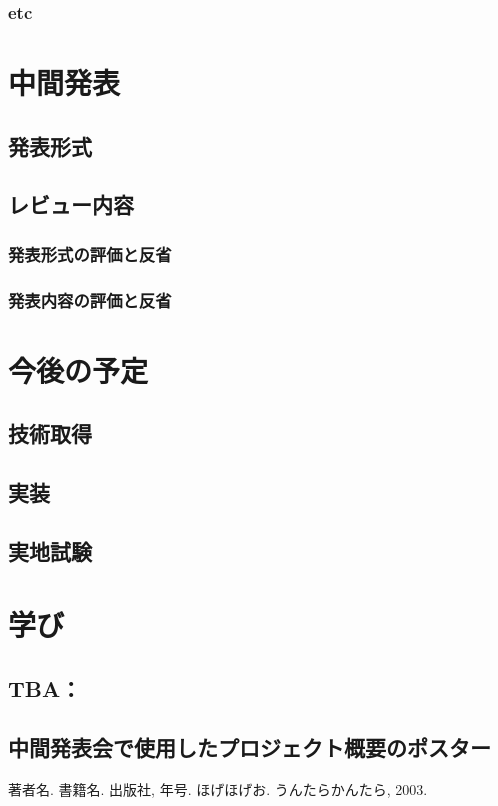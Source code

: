 \documentclass[openany,11pt,papersize]{jsbook}
\begin{document}
\subsection{etc}


\chapter{中間発表}

\section{発表形式}

\section{レビュー内容}

\subsection{発表形式の評価と反省}

\subsection{発表内容の評価と反省}


\chapter{今後の予定}

\section{技術取得}

\section{実装}

\section{実地試験}


\chapter{学び}

\section{TBA：}


\begin{appendix}

\chapter{中間発表会で使用したプロジェクト概要のポスター}

\end{appendix}



\begin{thebibliography}{9}
  著者名. 書籍名. 出版社,  年号.
  ほげほげお. うんたらかんたら,  2003.
\end{thebibliography}
\end{document}
